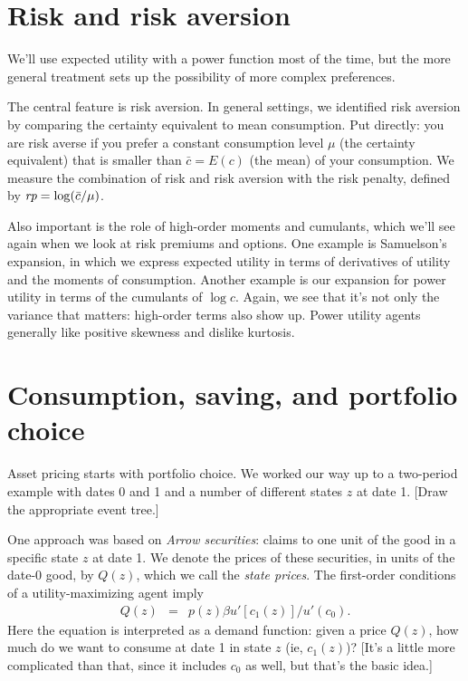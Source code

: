 \documentclass[11pt]{article}
\begin{document}
\section*{Risk and risk aversion}

We'll use expected utility with a power function most of the time,
but the more general treatment sets up
the possibility of more complex preferences.

The central feature is risk aversion.
In general settings, we identified risk aversion by
comparing the certainty equivalent to mean consumption.
Put directly:  you are risk averse if you prefer a constant consumption
level $\mu$ (the certainty equivalent) that is smaller than $\bar{c} = E(c)$ (the mean)
of your consumption.
We measure the combination of risk and risk aversion with the risk penalty,
defined by $ \mbox{\it rp} = \log (\bar{c}/\mu)$.

Also important is the role of high-order moments and cumulants,
which we'll see again when we look at risk premiums and options.
One example is Samuelson's expansion, in which we express
expected utility in terms of derivatives of utility and the moments of consumption.
Another example is our expansion for power utility in terms
of the cumulants of $\log c$.
Again, we see that it's not only the variance that matters:
high-order terms also show up.
Power utility agents generally like positive skewness and dislike
kurtosis.


\section*{Consumption, saving, and portfolio choice}

Asset pricing starts with portfolio choice.
We worked our way up to a two-period example
with dates 0 and 1 and a number of different states $z$ at date 1.
[Draw the appropriate event tree.]

One approach was based on {\it Arrow securities\/}:
claims to one unit of the good in a specific state $z$ at date 1.
We denote the prices of these securities, in units of the date-0 good, by
$Q(z)$, which we call the {\it state prices\/}.
The first-order conditions of a utility-maximizing agent  imply
\begin{eqnarray}
    Q(z) &=& p(z) \beta u'[c_1(z)]/u'(c_0) .
    \label{eq:state-prices=mrs}
\end{eqnarray}
Here the equation is interpreted as a demand function: given a price $Q(z)$,
how much do we want to consume at date 1 in state $z$ (ie, $c_1(z)$)?
[It's a little more complicated than that, since it includes $c_0$ as well,
but that's the basic idea.]
\end{document}
